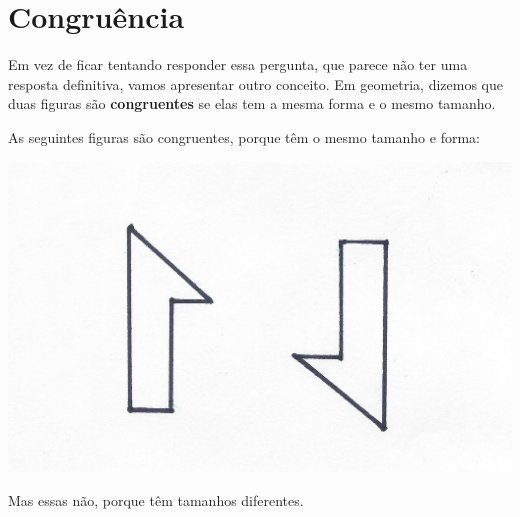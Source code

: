 \documentclass[twoside, 12pt]{article}
\begin{document}
\section{Congruência}

Em vez de ficar tentando responder essa pergunta, que parece não ter uma
resposta definitiva, vamos apresentar outro conceito. Em geometria,
dizemos que duas figuras são \textbf{congruentes} se elas tem a mesma
forma e o mesmo tamanho.

As seguintes figuras são congruentes, porque têm o mesmo tamanho e
forma:

\begin{center}
  \includegraphics[height=0.2\textheight]{img/03-2}
\end{center}

Mas essas não, porque têm tamanhos diferentes.
\end{document}
